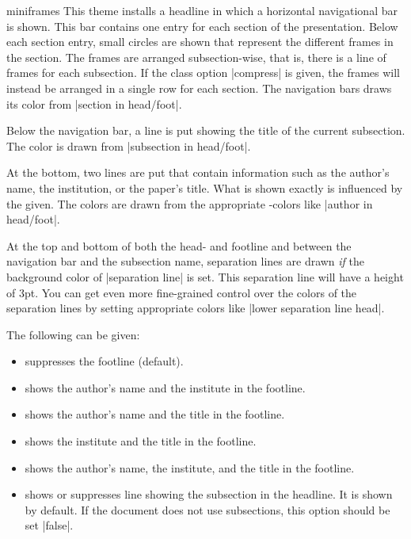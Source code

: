 \begin{outerthemeexample}{miniframes}
  This theme installs a headline in which a horizontal navigational bar is shown. This bar contains one entry for each section of the presentation. Below each section entry, small circles are shown that represent the different frames in the section. The frames are arranged subsection-wise, that is, there is a line of frames for each subsection. If the class option |compress| is given, the frames will instead be arranged in a single row for each section. The navigation bars draws its color from |section in head/foot|.

  Below the navigation bar, a line is put showing the title of the current subsection. The color is drawn from |subsection in head/foot|.

  At the bottom, two lines are put that contain information such as the author's name, the institution, or the paper's title. What is shown exactly is influenced by the  given. The colors are drawn from the appropriate \beamer-colors like |author in head/foot|.

  At the top and bottom of both the head- and footline and between the navigation bar and the subsection name, separation lines are drawn \emph{if} the background color of |separation line| is set. This separation line will have a height of 3pt. You can get even more fine-grained control over the colors of the separation lines by setting appropriate colors like |lower separation line head|.

  The following  can be given:
  \begin{itemize}
  \item {} suppresses the footline (default).
  \item {} shows the author's name and the institute in the footline.
  \item {} shows the author's name and the title in the footline.
  \item {} shows the institute and the title in the footline.
  \item {} shows the author's name, the institute, and the title in the footline.
  \item {} shows or suppresses line showing the subsection in the headline. It is shown by default. If the document does not use subsections, this option should be set |false|.
  \end{itemize}
\end{outerthemeexample}

